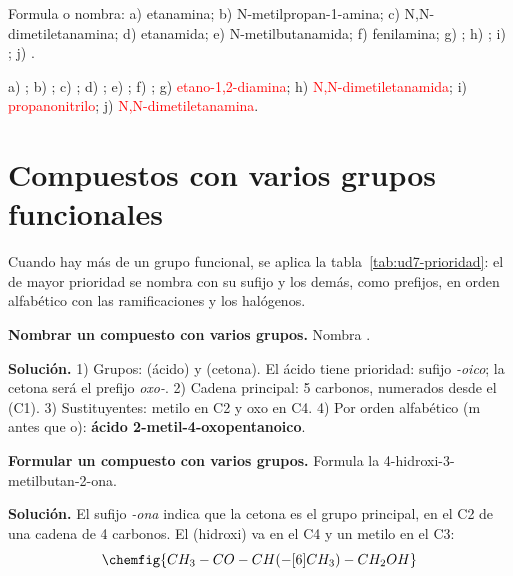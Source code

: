 \begin{exercise}
    Formula o nombra: a) etanamina; b) N-metilpropan-1-amina; c) N,N-dimetiletanamina; d) etanamida; e) N-metilbutanamida;
    f) fenilamina; g) ; h) ; i) ; j) .
    \begin{solu}
        a) \textcolor{red}{}; b) \textcolor{red}{}; c) \textcolor{red}{};
        d) \textcolor{red}{}; e) \textcolor{red}{}; f) \textcolor{red}{};
        g) \textcolor{red}{etano-1,2-diamina}; h) \textcolor{red}{N,N-dimetiletanamida}; i) \textcolor{red}{propanonitrilo};
        j) \textcolor{red}{N,N-dimetiletanamina}.
    \end{solu}
\end{exercise}

\section{Compuestos con varios grupos funcionales}\label{sec:ud7-varios}

Cuando hay más de un grupo funcional, se aplica la tabla~\ref{tab:ud7-prioridad}: el de mayor prioridad se nombra con su sufijo y
los demás, como prefijos, en orden alfabético con las ramificaciones y los halógenos.

\begin{example}
    \textbf{Nombrar un compuesto con varios grupos.} Nombra .

    \textbf{Solución.} 1) Grupos:  (ácido) y  (cetona). El ácido tiene prioridad: sufijo \emph{-oico}; la cetona
    será el prefijo \emph{oxo-}. 2) Cadena principal: 5 carbonos, numerados desde el  (C1). 3) Sustituyentes: metilo en
    C2 y oxo en C4. 4) Por orden alfabético (m antes que o): \textbf{ácido 2-metil-4-oxopentanoico}.
\end{example}

\begin{example}
    \textbf{Formular un compuesto con varios grupos.} Formula la 4-hidroxi-3-metilbutan-2-ona.

    \textbf{Solución.} El sufijo \emph{-ona} indica que la cetona es el grupo principal, en el C2 de una cadena de 4 carbonos. El
     (hidroxi) va en el C4 y un metilo en el C3:
    \[ \chemfig{CH_3-CO-CH(-[6]CH_3)-CH_2OH} \]
\end{example}

